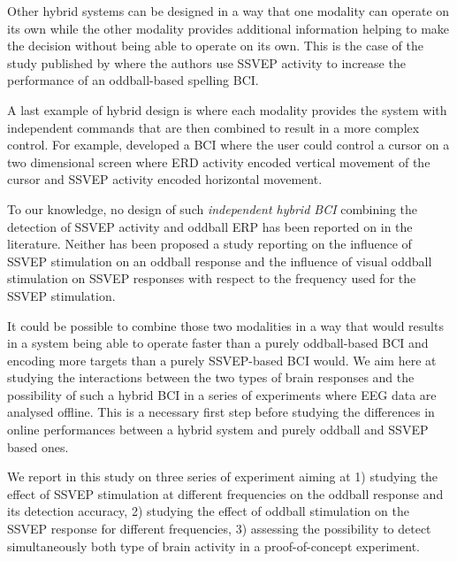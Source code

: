 \documentclass[10pt]{article}
\begin{document}
Other hybrid systems can be designed in a way that one modality can operate on its own while the other modality provides additional information helping to make the decision without being able to operate on its own.
This is the case of the study published by \textcite{Yin2013} where the authors use \ac{SSVEP} activity to increase the performance of an oddball-based spelling \ac{BCI}.

A last example of hybrid design is where each modality provides the system with independent commands that are then combined to result in a more complex control.
For example, \textcite{Allison2012} developed a \ac{BCI} where the user could control a cursor on a two dimensional screen where \ac{ERD} activity encoded vertical movement of the cursor and \ac{SSVEP} activity encoded horizontal movement.

To our knowledge, no design of such \emph{independent hybrid \ac{BCI}} combining the detection of \ac{SSVEP} activity and oddball \ac{ERP} has been reported on in the literature.
Neither has been proposed a study reporting on the influence of \ac{SSVEP} stimulation on an oddball response and the influence of visual oddball stimulation on \ac{SSVEP} responses with respect to the frequency used for the \ac{SSVEP} stimulation.

It could be possible to combine those two modalities in a way that would results in a system being able to operate faster than a purely oddball-based \ac{BCI} and encoding more targets than a purely \ac{SSVEP}-based \ac{BCI} would.
We aim here at studying the interactions between the two types of brain responses and the possibility of such a hybrid \ac{BCI} in a series of experiments where \ac{EEG} data are analysed offline.
This is a necessary first step before studying the differences in online performances between a hybrid system and purely oddball and \ac{SSVEP} based ones.

We report in this study on three series of experiment aiming at
1) studying the effect of \ac{SSVEP} stimulation at different frequencies on the oddball response and its detection accuracy,
2) studying the effect of oddball stimulation on the \ac{SSVEP} response for different frequencies,
3) assessing the possibility to detect simultaneously both type of brain activity in a proof-of-concept experiment.
\end{document}
